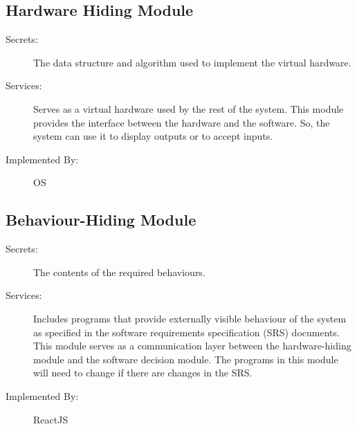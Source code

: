 \documentclass[12pt, titlepage]{article}
\begin{document}

\subsection{Hardware Hiding Module}

\begin{description}
\item[Secrets:]The data structure and algorithm used to implement the virtual
  hardware.
\item[Services:]Serves as a virtual hardware used by the rest of the
  system. This module provides the interface between the hardware and the
  software. So, the system can use it to display outputs or to accept inputs.
\item[Implemented By:] OS
\end{description}

\subsection{Behaviour-Hiding Module}

\begin{description}
\item[Secrets:]The contents of the required behaviours.
\item[Services:]Includes programs that provide externally visible behaviour of
  the system as specified in the software requirements specification (SRS)
  documents. This module serves as a communication layer between the
  hardware-hiding module and the software decision module. The programs in this
  module will need to change if there are changes in the SRS.
\item[Implemented By:] ReactJS
\end{description}



\end{document}
